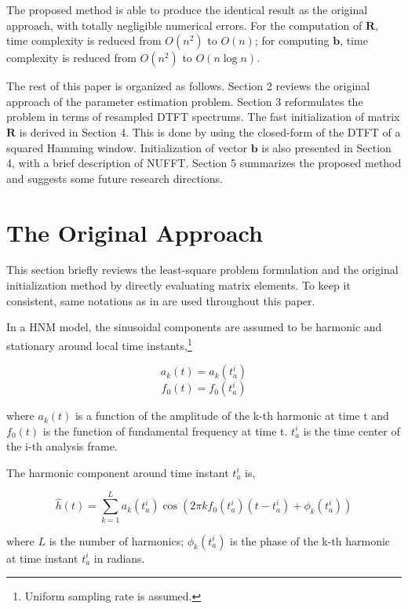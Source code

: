 \documentclass[dvips]{article}
\newcommand{\matr}[1]{\mathbf{#1}}
\begin{document}
The proposed method is able to produce the identical result as the original approach, with totally negligible numerical errors. For the computation of $\matr{R}$, time complexity is reduced from $O(n^2)$ to $O(n)$; for computing $\matr{b}$, time complexity is reduced from $O(n^2)$ to $O(n\log n)$.

The rest of this paper is organized as follows. Section 2 reviews the original approach of the parameter estimation problem. Section 3 reformulates the problem in terms of resampled DTFT spectrums. The fast initialization of matrix $\matr{R}$ is derived in Section 4. This is done by using the closed-form of the DTFT of a squared Hamming window. Initialization of vector $\matr{b}$ is also presented in Section 4, with a brief description of NUFFT. Section 5 summarizes the proposed method and suggests some future research directions.

\section{The Original Approach}

This section briefly reviews the least-square problem formulation and the original initialization method by directly evaluating matrix elements. To keep it consistent, same notations as in \cite{stylianou-1996} are used throughout this paper.

In a HNM model, the sinusoidal components are assumed to be harmonic and stationary around local time instants,\footnote{Uniform sampling rate is assumed.}

\begin{equation}
a_k(t) = a_k(t^i_a)
\end{equation}
\begin{equation}
f_0(t) = f_0(t^i_a)
\end{equation}

where $a_k(t)$ is a function of the amplitude of the k-th harmonic at time t and $f_0(t)$ is the function of fundamental frequency at time t. $t^i_a$ is the time center of the i-th analysis frame.

The harmonic component around time instant $t^i_a$ is,

\begin{equation} \label{origh}
\hat{h}(t) = \sum_{k = 1}^{L} a_k(t^i_a)\cos(2\pi k f_0(t^i_a)(t - t^i_a) + \phi_k(t^i_a))
\end{equation}

where $L$ is the number of harmonics; $\phi_k(t^i_a)$ is the phase of the k-th harmonic at time instant $t^i_a$ in radians.
\end{document}
